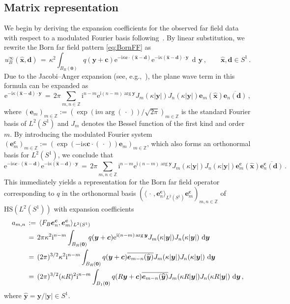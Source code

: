 \documentclass[11pt,a4paper]{article}
\theoremstyle{definition}
\theoremstyle{remark} \newtheorem{remark}[theorem]{Remark}
\numberwithin{equation}{section}
\numberwithin{figure}{section}
\numberwithin{algorithm}{section}
\numberwithin{table}{section}
\newcommand{\field}[1]{{\mathbb{#1}}}
\newcommand{\Z}{\field{Z}}
\newcommand{\bs}{\boldsymbol}
\newcommand{\bfc}{{\bs c}}
\newcommand{\bfd}{{\bs d}}
\newcommand{\bfe}{{\bs e}}
\newcommand{\bfx}{{\bs x}}
\newcommand{\bfy}{{\bs y}}
\newcommand{\bfzero}{{\bs 0}}
\newcommand{\xhat}{\widehat{\bfx}}
\newcommand{\yhat}{\widehat{\bfy}}
\newcommand{\HS}{\mathrm{HS}}
\newcommand{\dy}{\, \dif \bfy}
\newcommand{\idir}{\bfd}
\newcommand{\rmi}{\mathrm{i}}
\newcommand{\rme}{\mathrm{e}}
\newcommand{\ph}{\,\cdot\,}
\newcommand{\Sone}{{S^1}}
\newcommand{\Sd}{{S^1}}
\newcommand{\Ltwo}{{L^2}}
\newcommand{\LtwoSd}{{L^2(\Sd)}}
\DeclareMathOperator{\dif}{d\!}
\begin{document}
\subsection{Matrix representation}
We begin by deriving the expansion coefficients for the observed far field data with respect to a modulated Fourier basis following~\cite{GriSch24}. By linear substitution, we rewrite the Born far field pattern \eqref{eq:BornFF} as
\begin{equation*}
	u_B^\infty(\xhat,\idir) \,=\, \kappa^2 \int_{B_R(\bfzero)} q(\bfy+\bfc)\rme^{-\rmi\kappa\bfc\cdot(\xhat-\idir)}\rme^{-\rmi \kappa (\xhat-\idir)\cdot\bfy}\dy\,, \qquad \xhat,\idir\in\Sone\,.
\end{equation*}
Due to the Jacobi--Anger expansion (see, e.g.,~\cite[Eq.~(3.112)]{ColKre19}), the plane wave term in this formula can be expanded as
\begin{equation*}
\rme^{-\rmi \kappa (\xhat-\idir)\cdot\bfy} \,=\,  2\pi \sum_{m,n\in\Z}  \rmi^{n-m} \rme^{\rmi(n-m)\arg\bfy}J_m(\kappa|\bfy|)J_n(\kappa|\bfy|)\bfe_m(\xhat)\overline{\bfe_{n}(\idir)}\,,
\end{equation*}
where $(\bfe_m)_{m\in\Z}:=(\exp(\rmi m\arg(\ph))/\sqrt{2\pi})_{m\in\Z}$ is the standard Fourier basis of $\LtwoSd$ and $J_m$ denotes the Bessel function of the first kind and order $m$.
By introducing the modulated Fourier system $(\bfe^\bfc_m)_{m\in\Z}:=(\exp(-\rmi\kappa\bfc\cdot(\ph))\bfe_m)_{m\in\Z}$, which also forms an orthonormal basis for $\Ltwo(\Sone)$, we conclude that
\begin{equation*}
\rme^{-\rmi\kappa\bfc\cdot(\xhat-\idir)}\rme^{-\rmi \kappa (\xhat-\idir)\cdot\bfy} \,=\,  2\pi \sum_{m,n\in\Z}  \rmi^{n-m} \rme^{\rmi(n-m)\arg\bfy}J_m(\kappa|\bfy|)J_n(\kappa|\bfy|)\bfe^\bfc_m(\xhat)\overline{\bfe^\bfc_{n}(\idir)}\,.
\end{equation*}
This immediately yields a representation for the Born far field operator corresponding to $q$ in the orthonormal basis $(\langle\ph,\bfe^\bfc_n\rangle_{\Ltwo(\Sone)}\bfe^\bfc_m)_{m,n\in\Z}$ of $\HS(\Ltwo(\Sone))$ with expansion coefficients 
\begin{align}
	a_{m,n} &\,:=\, \langle F_B\bfe^\bfc_n,\bfe^\bfc_m\rangle_{L^2(\Sone)} \notag\\
    &\,=\, 2\pi \kappa^2\rmi^{n-m} \int_{B_R(\bfzero)} q(\bfy+\bfc)\rme^{\rmi(n-m)\arg\bfy}J_m(\kappa|\bfy|)J_n(\kappa|\bfy|)\dy \notag\\
	&\,=\, (2\pi)^{3/2} \kappa^2\rmi^{n-m} \int_{B_R(\bfzero)} q(\bfy+\bfc)\overline{\bfe_{m-n}(\yhat)}J_m(\kappa|\bfy|)J_n(\kappa|\bfy|)\dy \notag\\
    &\,=\, (2\pi)^{3/2} (\kappa R)^2\rmi^{n-m} \int_{B_1(\bfzero)} q(R\bfy+\bfc)\overline{\bfe_{m-n}(\yhat)}J_m(\kappa R|\bfy|)J_n(\kappa R|\bfy|)\dy \,,
    \label{eq:exp_coeff_FF}
\end{align}
where $\yhat = \bfy/|\bfy|\in\Sone$.
\end{document}

